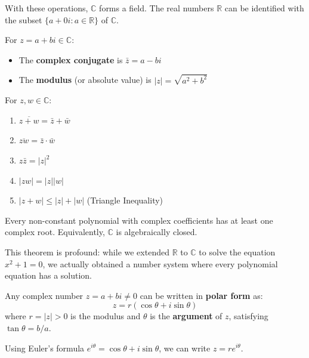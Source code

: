 With these operations, $\mathbb{C}$ forms a field. The real numbers $\mathbb{R}$ can be identified with the subset $\{a + 0i : a \in \mathbb{R}\}$ of $\mathbb{C}$.

\begin{definition}
For $z = a + bi \in \mathbb{C}$:
\begin{itemize}
    \item The \textbf{complex conjugate} is $\bar{z} = a - bi$
    \item The \textbf{modulus} (or absolute value) is $|z| = \sqrt{a^2 + b^2}$
\end{itemize}
\end{definition}

\begin{theorem}
For $z, w \in \mathbb{C}$:
\begin{enumerate}
    \item $\overline{z + w} = \bar{z} + \bar{w}$
    \item $\overline{zw} = \bar{z} \cdot \bar{w}$
    \item $z\bar{z} = |z|^2$
    \item $|zw| = |z||w|$
    \item $|z + w| \le |z| + |w|$ (Triangle Inequality)
\end{enumerate}
\end{theorem}

\begin{theorem}
Every non-constant polynomial with complex coefficients has at least one complex root. Equivalently, $\mathbb{C}$ is algebraically closed.
\end{theorem}

This theorem is profound: while we extended $\mathbb{R}$ to $\mathbb{C}$ to solve the equation $x^2 + 1 = 0$, we actually obtained a number system where every polynomial equation has a solution.

\begin{definition}
Any complex number $z = a + bi \neq 0$ can be written in \textbf{polar form} as:
\[
z = r(\cos\theta + i\sin\theta)
\]
where $r = |z| > 0$ is the modulus and $\theta$ is the \textbf{argument} of $z$, satisfying $\tan\theta = b/a$.
\end{definition}

Using Euler's formula $e^{i\theta} = \cos\theta + i\sin\theta$, we can write $z = re^{i\theta}$.

